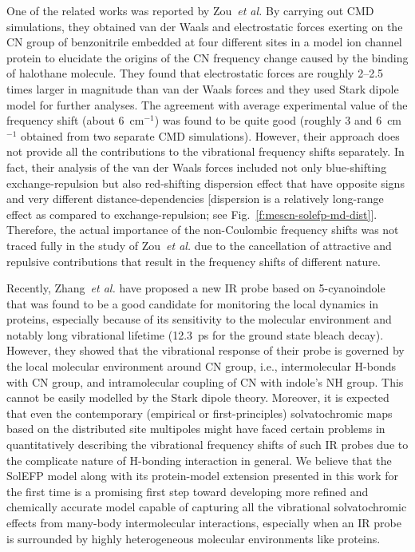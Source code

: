 \documentclass[b5paper,oneside,fleqn,11pt]{book}
\begin{document}
\begin{refsection}
One of the related works was reported by Zou~\emph{et al.} By carrying
out CMD simulations, they obtained van der Waals and
electrostatic forces exerting on the CN group of benzonitrile
embedded at four different sites in a model ion channel
protein to elucidate the origins of the CN frequency change
caused by the binding of halothane molecule. \citep{Zou.Liu.Blasie.BiophysJ.2009} 
They found that
electrostatic forces are roughly 2--2.5 times larger in magnitude
than van der Waals forces and they used Stark dipole model
for further analyses. The agreement with average
experimental value of the frequency shift (about 6~cm$^{-1}$) was
found to be quite good (roughly 3 and 6~cm$^{-1}$ obtained from
two separate CMD simulations). However, their approach does
not provide all the contributions to the vibrational frequency
shifts separately. In fact, their analysis of the van der Waals
forces included not only blue\hyp{}shifting exchange\hyp{}repulsion but
also red\hyp{}shifting dispersion effect that have opposite signs and
very different distance\hyp{}dependencies [dispersion is a relatively
long\hyp{}range effect as compared to exchange\hyp{}repulsion; see
Fig.~\ref{f:mescn-solefp-md-dist}]. 
Therefore, the actual importance of the non\hyp{}Coulombic 
frequency shifts was not traced fully in the study of
Zou~\emph{et al.} \citep{Zou.Liu.Blasie.BiophysJ.2009}  
due to the cancellation of attractive and repulsive
contributions that result in the frequency shifts of different
nature.

Recently, Zhang~\emph{et al.} have proposed a new IR probe based on
5\hyp{}cyanoindole that was found to be a good candidate for
monitoring the local dynamics in proteins, especially because
of its sensitivity to the molecular environment and notably
long vibrational lifetime (12.3~ps for the ground state bleach
decay). \citep{Zhang.Markiewicz.Doerksen.Smith.Gai.PCCP.2015} 
However, they showed that the vibrational response
of their probe is governed by the local molecular environment
around CN group, i.e., intermolecular H-bonds with CN group,
and intramolecular coupling of CN with indole's NH group. This
cannot be easily modelled by the Stark dipole theory.
Moreover, it is expected that even the contemporary
(empirical or first\hyp{}principles) solvatochromic maps based on
the distributed site multipoles \citep{Waegele.Gai.JCPL.2010,
Lee.Choi.Cho.JCP.2012,Blasiak.Lee.Cho.JCP.2013} might have faced certain
problems in quantitatively describing the vibrational frequency
shifts of such IR probes due to the complicate nature of H-bonding
interaction in general. We believe that the SolEFP
model along with its protein\hyp{}model extension presented in this
work for the first time is a promising first step toward
developing more refined and chemically accurate model
capable of capturing all the vibrational solvatochromic effects
from many\hyp{}body intermolecular interactions, especially when
an IR probe is surrounded by highly heterogeneous molecular
environments like proteins.



\end{refsection}
\end{document}
